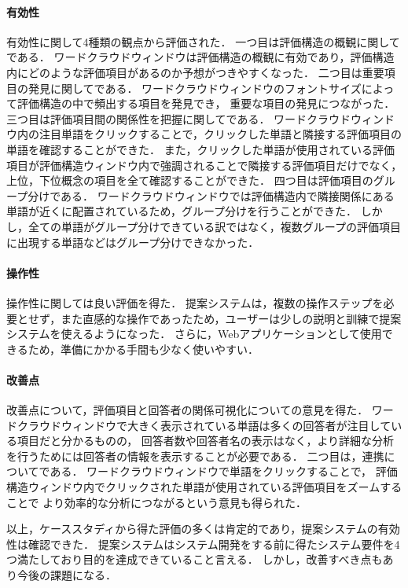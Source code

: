 \documentclass[syuuron]{kuee}
\begin{document}
		\paragraph{有効性}
		有効性に関して4種類の観点から評価された．
		一つ目は評価構造の概観に関してである．
		ワードクラウドウィンドウは評価構造の概観に有効であり，評価構造内にどのような評価項目があるのか予想がつきやすくなった．
		二つ目は重要項目の発見に関してである．
		ワードクラウドウィンドウのフォントサイズによって評価構造の中で頻出する項目を発見でき，
		重要な項目の発見につながった．
		三つ目は評価項目間の関係性を把握に関してである．
		ワードクラウドウィンドウ内の注目単語をクリックすることで，クリックした単語と隣接する評価項目の単語を確認することができた．
		また，クリックした単語が使用されている評価項目が評価構造ウィンドウ内で強調されることで隣接する評価項目だけでなく，
		上位，下位概念の項目を全て確認することができた．
		四つ目は評価項目のグループ分けである．
		ワードクラウドウィンドウでは評価構造内で隣接関係にある単語が近くに配置されているため，グループ分けを行うことができた．
		しかし，全ての単語がグループ分けできている訳ではなく，複数グループの評価項目に出現する単語などはグループ分けできなかった．
		
		\paragraph{操作性}
		操作性に関しては良い評価を得た．
		提案システムは，複数の操作ステップを必要とせず，また直感的な操作であったため，ユーザーは少しの説明と訓練で提案システムを使えるようになった．
		さらに，Webアプリケーションとして使用できるため，準備にかかる手間も少なく使いやすい．
		
		\paragraph{改善点}
		改善点について，評価項目と回答者の関係可視化についての意見を得た．
		ワードクラウドウィンドウで大きく表示されている単語は多くの回答者が注目している項目だと分かるものの，
		回答者数や回答者名の表示はなく，より詳細な分析を行うためには回答者の情報を表示することが必要である．
		二つ目は，連携についてである．
		ワードクラウドウィンドウで単語をクリックすることで，
		評価構造ウィンドウ内でクリックされた単語が使用されている評価項目をズームすることで
		より効率的な分析につながるという意見も得られた．
		
		以上，ケーススタディから得た評価の多くは肯定的であり，提案システムの有効性は確認できた．
		提案システムはシステム開発をする前に得たシステム要件を4つ満たしており目的を達成できていること言える．
		しかし，改善すべき点もあり今後の課題になる．
		
\end{document}
